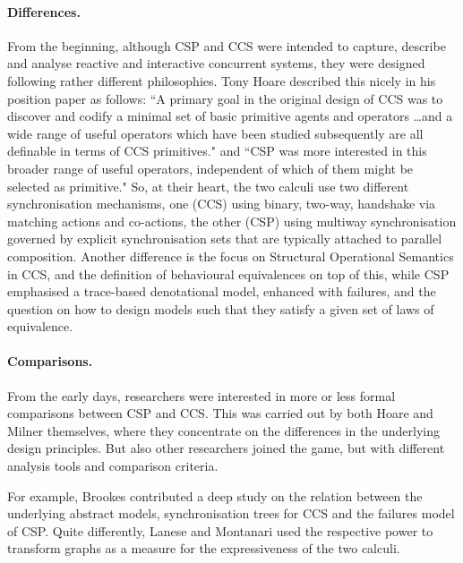 \documentclass[]{eptcs}
\begin{document}
\paragraph{Differences.}
From the beginning, although CSP \cite{hoare:78csp} and CCS \cite{CCS} were intended to capture, describe and analyse reactive and interactive concurrent systems, they were designed following rather different philosophies. Tony Hoare described this nicely in his position paper \cite{Hoare2006209} as follows: ``A primary goal in the original design of CCS was to discover and codify a minimal set of basic primitive agents and operators \dots and a wide range of useful operators which have been studied subsequently are all definable in terms of CCS primitives." and ``CSP was more interested in this broader range of useful operators, independent of which of them might be selected as primitive." So, at their heart, the two calculi use two different synchronisation mechanisms, one (CCS) using binary, \ie two-way, handshake via matching actions and co-actions, the other (CSP) using multiway synchronisation governed by explicit synchronisation sets that are typically attached to parallel composition. Another difference is the focus on Structural Operational Semantics in CCS, and the definition of behavioural equivalences on top of this, while CSP emphasised a trace-based denotational model, enhanced with failures, and the question on how to design models such that they satisfy a given set of laws of equivalence.

\paragraph{Comparisons.}
From the early days, researchers were interested in more or less formal comparisons between CSP and CCS. This was carried out by both Hoare \cite{Hoare2006209} and Milner \cite{DBLP:conf/ifip/Milner86} themselves, where they concentrate on the differences in the underlying design principles. But also other researchers joined the game, but with different analysis tools and comparison criteria. 

For example, Brookes \cite{DBLP:conf/icalp/Brookes83} contributed a deep study on the relation between the underlying abstract models, synchronisation trees for CCS and the failures model of CSP. Quite differently, Lanese and Montanari \cite{Lanese200655} used the respective power to transform graphs as a measure for the expressiveness of the two calculi. 
\end{document}
